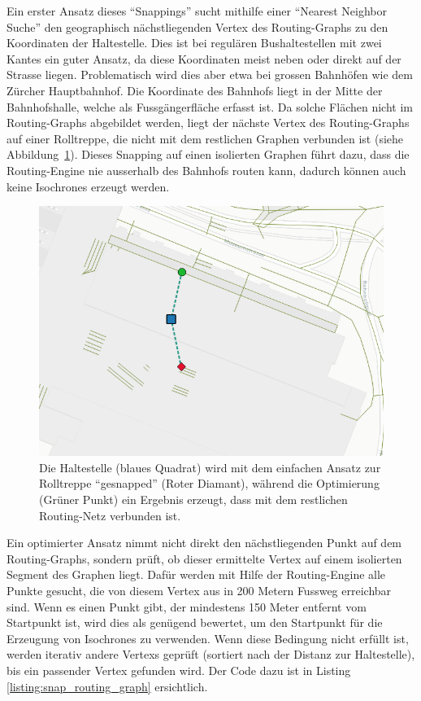 Ein erster Ansatz dieses "`Snappings"' sucht mithilfe einer "`\gls{Nearest Neighbor Suche}"' den geographisch nächstliegenden \gls{Vertex} des \glspl{Routing-Graph} zu den Koordinaten der \gls{Haltestelle}.
Dies ist bei regulären Bushaltestellen mit zwei \glspl{Kante} ein guter Ansatz, da diese Koordinaten meist neben oder direkt auf der Strasse liegen.
Problematisch wird dies aber etwa bei grossen Bahnhöfen wie dem Zürcher Hauptbahnhof.
Die Koordinate des Bahnhofs liegt in der Mitte der Bahnhofshalle, welche als Fussgängerfläche erfasst ist.
Da solche Flächen nicht im \glspl{Routing-Graph} abgebildet werden, liegt der nächste \gls{Vertex} des \glspl{Routing-Graph} auf einer Rolltreppe, die nicht mit dem restlichen Graphen verbunden ist (siehe Abbildung~\ref{fig:snapping_comparison}).
Dieses Snapping auf einen isolierten Graphen führt dazu, dass die \gls{Routing-Engine} nie ausserhalb des Bahnhofs routen kann, dadurch können auch keine \glspl{Isochrone} erzeugt werden.

\begin{figure}[ht]
    \centering
    \includegraphics[width=1\linewidth]{projectdoc/img/snapping_comparison}
    \caption[Snapping der Haltestelle auf den Routing-Graphen]{Die \gls{Haltestelle} (blaues Quadrat) wird mit dem einfachen Ansatz zur Rolltreppe "`gesnapped"' (Roter Diamant), während die Optimierung (Grüner Punkt) ein Ergebnis erzeugt, dass mit dem restlichen Routing-Netz verbunden ist.}
    \label{fig:snapping_comparison}
\end{figure}

Ein optimierter Ansatz nimmt nicht direkt den nächstliegenden Punkt auf dem \glspl{Routing-Graph}, sondern prüft, ob dieser ermittelte \gls{Vertex} auf einem isolierten Segment des Graphen liegt.
Dafür werden mit Hilfe der \gls{Routing-Engine} alle Punkte gesucht, die von diesem \gls{Vertex} aus in 200 Metern Fussweg erreichbar sind.
Wenn es einen Punkt gibt, der mindestens 150 Meter entfernt vom Startpunkt ist, wird dies als genügend bewertet, um den Startpunkt für die Erzeugung von \glspl{Isochrone} zu verwenden.
Wenn diese Bedingung nicht erfüllt ist, werden iterativ andere \glspl{Vertex} geprüft (sortiert nach der Distanz zur \gls{Haltestelle}), bis ein passender \gls{Vertex} gefunden wird.
Der Code dazu ist in Listing \ref{listing:snap_routing_graph} ersichtlich.

